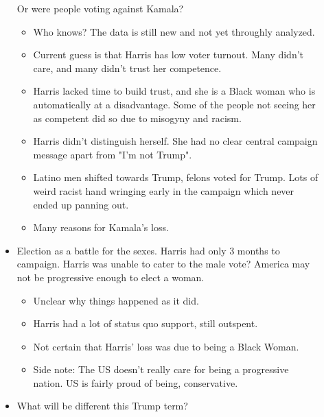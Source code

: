 \documentclass{report}
\begin{document}
\begin{description}
\begin{itemize}
                Or were people voting against Kamala?
                \begin{itemize}
                    \item Who knows? The data is still new and not yet
                        throughly analyzed.
                    \item Current guess is that Harris has low voter
                        turnout. Many didn't care, and many didn't
                        trust her competence.
                    \item Harris lacked time to build trust, and she
                        is a Black woman who is automatically at a
                        disadvantage. Some of the people not seeing
                        her as competent did so due to misogyny and
                        racism.
                    \item Harris didn't distinguish herself. She had
                        no clear central campaign message apart from
                        "I'm not Trump".
                    \item Latino men shifted towards Trump, felons voted
                        for Trump. Lots of weird racist hand wringing
                        early in the campaign which never ended up
                        panning out.
                    \item Many reasons for Kamala's loss.
                \end{itemize}
            \item Election as a battle for the sexes. Harris had only
                3 months to campaign. Harris was unable to cater to
                the male vote? America may not be progressive enough
                to elect a woman.
                \begin{itemize}
                    \item Unclear why things happened as it did.
                    \item Harris had a lot of status quo support,
                        still outspent.
                    \item Not certain that Harris' loss was due to
                        being a Black Woman.
                    \item Side note: The US doesn't really care
                        for being a progressive nation. US is fairly
                        proud of being, conservative.
                \end{itemize}
            \item What will be different this Trump term?

\end{itemize}
\end{description}
\end{document}
